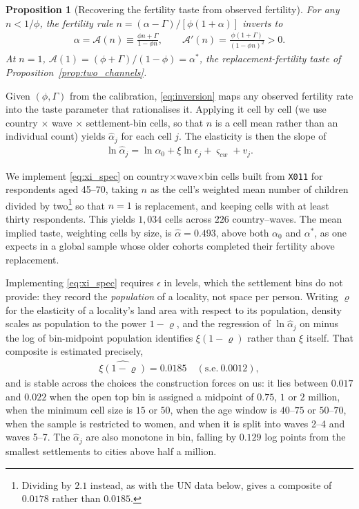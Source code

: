 \documentclass[11pt]{article}
\newtheorem{proposition}{Proposition}
\begin{document}
\begin{proposition}[Recovering the fertility taste from observed fertility]
\label{prop:inversion}
For any $n<1/\phi$, the fertility rule $n=(\alpha-\Gamma)/[\phi(1+\alpha)]$ inverts to
\begin{align}
\alpha=\mathcal{A}(n)\equiv\frac{\phi n+\Gamma}{1-\phi n},
\qquad
\mathcal{A}'(n)=\frac{\phi(1+\Gamma)}{(1-\phi n)^{2}}>0 .
\label{eq:inversion}
\end{align}
At $n=1$, $\mathcal{A}(1)=(\phi+\Gamma)/(1-\phi)=\alpha^{\ast}$, the replacement-fertility taste of
Proposition~\ref{prop:two_channels}.
\end{proposition}

Given $(\phi,\Gamma)$ from the calibration, \eqref{eq:inversion} maps any observed fertility rate
into the taste parameter that rationalises it. Applying it cell by cell (we use country
$\times$ wave $\times$ settlement-bin cells, so that $n$ is a cell mean rather than an individual
count) yields $\hat\alpha_{j}$ for each cell $j$. The elasticity is then the slope of
\begin{align}
\ln \hat\alpha_{j}=\ln\alpha_0+\xi \ln \epsilon_{j}+\varsigma_{cw}+v_{j}.
\label{eq:xi_spec}
\end{align}

We implement \eqref{eq:xi_spec} on country$\times$wave$\times$bin cells built from \texttt{X011}
for respondents aged 45--70, taking $n$ as the cell's weighted mean number of children divided by two\footnote{Dividing by
$2.1$ instead, as with the UN data below, gives a composite of $0.0178$ rather than $0.0185$.} so that
$n=1$ is replacement, and keeping cells with at least thirty respondents. This yields $1{,}034$
cells across $226$ country--waves. The mean implied taste, weighting cells by size, is $\hat\alpha=0.493$, above both
$\alpha_0$ and $\alpha^{\ast}$, as one expects in a global sample whose older cohorts completed
their fertility above replacement.

Implementing \eqref{eq:xi_spec} requires $\epsilon$ in levels, which the settlement bins do not
provide: they record the \emph{population} of a locality, not space per person. Writing
$\varrho$ for the elasticity of a locality's land area with respect to its population, density scales
as population to the power $1-\varrho$, and the regression of $\ln\hat\alpha_j$ on minus the log of
bin-midpoint population identifies $\xi(1-\varrho)$ rather than $\xi$ itself. That composite is
estimated precisely,
\begin{align}
\widehat{\xi(1-\varrho)}=0.0185\quad(\text{s.e.}\ 0.0012),
\label{eq:xi_composite}
\end{align}
and is stable across the choices the construction forces on us: it lies between $0.017$ and $0.022$
when the open top bin is assigned a midpoint of $0.75$, $1$ or $2$ million, when the minimum cell
size is $15$ or $50$, when the age window is $40$--$75$ or $50$--$70$, when the sample is restricted
to women, and when it is split into waves 2--4 and waves 5--7. The $\hat\alpha_j$ are also monotone
in bin, falling by $0.129$ log points from the smallest settlements to cities above half a million.
\end{document}
